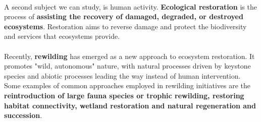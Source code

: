 \documentclass[../summary.tex]{subfiles}
\begin{document}
	\ \\
	A second subject we can study, is human activity. \textbf{Ecological restoration} is the process of \textbf{assisting the recovery of damaged, degraded, or destroyed ecosystems}. Restoration aims to reverse damage and protect the biodiversity and services that ecosystems provide.
	\\
	\\
	Recently, \textbf{rewilding} has emerged as a new approach to ecosystem restoration. It promotes "wild, autonomous" nature, with natural processes driven by keystone species and abiotic processes leading the way instead of human intervention. Some examples of common approaches employed in rewilding initiatives are the \textbf{reintroduction of large fauna species or trophic rewilding, restoring habitat connectivity, wetland restoration and natural regeneration and succession}. 
	
\end{document}
